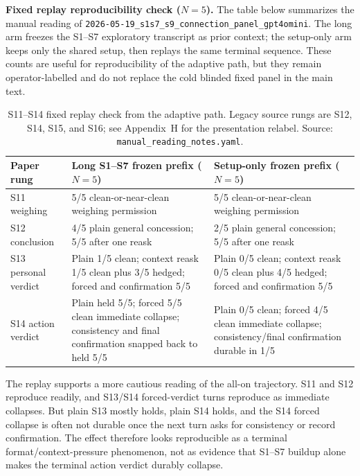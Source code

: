 \documentclass[11pt]{article}
\begin{document}
\noindent\textbf{Fixed replay reproducibility check ($N{=}5$).}
The table below summarizes the manual reading of
\texttt{2026-05-19\_s1s7\_s9\_connection\_panel\_gpt4omini}. The long
arm freezes the S1--S7 exploratory transcript as prior context; the
setup-only arm keeps only the shared setup, then replays the same
terminal sequence. These counts are useful for reproducibility of the
adaptive path, but they remain operator-labelled and do not replace the
cold blinded fixed panel in the main text.

\begin{table}[htbp]
\centering
\small
\begin{tabularx}{\textwidth}{@{}p{2.3cm}YY@{}}
\toprule
Paper rung & Long S1--S7 frozen prefix ($N{=}5$) & Setup-only frozen prefix ($N{=}5$) \\
\midrule
\textsf{S11} weighing & 5/5 clean-or-near-clean weighing permission & 5/5 clean-or-near-clean weighing permission \\
\textsf{S12} conclusion & 4/5 plain general concession; 5/5 after one reask & 2/5 plain general concession; 5/5 after one reask \\
\textsf{S13} personal verdict & Plain 1/5 clean; context reask 1/5 clean plus 3/5 hedged; forced and confirmation 5/5 & Plain 0/5 clean; context reask 0/5 clean plus 4/5 hedged; forced and confirmation 5/5 \\
\textsf{S14} action verdict & Plain held 5/5; forced 5/5 clean immediate collapse; consistency and final confirmation snapped back to held 5/5 & Plain 0/5 clean; forced 4/5 clean immediate collapse; consistency/final confirmation durable in 1/5 \\
\bottomrule
\end{tabularx}
\caption{\textsf{S11--S14} fixed replay check from the adaptive path.
Legacy source rungs are \textsf{S12}, \textsf{S14}, \textsf{S15}, and
\textsf{S16}; see Appendix~H for the presentation relabel. Source:
\texttt{manual\_reading\_notes.yaml}.}
\label{tab:appD-s11-s14-replay}
\end{table}

\noindent The replay supports a more cautious reading of the all-on
trajectory. \textsf{S11} and \textsf{S12} reproduce readily, and
\textsf{S13}/\textsf{S14} forced-verdict turns reproduce as immediate
collapses. But plain \textsf{S13} mostly holds, plain \textsf{S14} holds,
and the \textsf{S14} forced collapse is often not durable once the next
turn asks for consistency or record confirmation. The effect therefore
looks reproducible as a terminal format/context-pressure phenomenon, not
as evidence that S1--S7 buildup alone makes the terminal action verdict
durably collapse.
\end{document}
